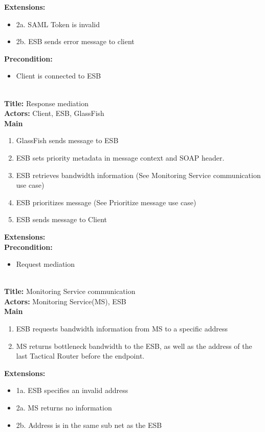     \textbf{Extensions:}
    \begin{itemize}
        \item[] 2a. SAML Token is invalid
        \item[] 2b. ESB sends error message to client
    \end{itemize}
    \textbf{Precondition:}
    \begin{itemize}
        \item Client is connected to ESB
    \end{itemize}
    \\
    \textbf{Title:} Response mediation \\
    \textbf{Actors:} Client, ESB, GlassFish \\
    \textbf{Main}
    \begin{enumerate}
        \item GlassFish sends message to ESB
        \item ESB sets priority metadata in message context and SOAP header.
        \item ESB retrieves bandwidth information (See Monitoring Service communication use case)
        \item ESB prioritizes message (See Prioritize message use case)
        \item ESB sends message to Client
    \end{enumerate}
    \textbf{Extensions:} \\
    \textbf{Precondition:}
    \begin{itemize}
        \item Request mediation
    \end{itemize}
    \\
    \textbf{Title:} Monitoring Service communication\\
    \textbf{Actors:} Monitoring Service(MS), ESB\\
    \textbf{Main}
    \begin{enumerate}
        \item ESB requests bandwidth information from MS to a specific address
        \item MS returns bottleneck bandwidth to the ESB, as well as the address of the last Tactical Router before the endpoint.
    \end{enumerate}
    \textbf{Extensions:}
    \begin{itemize}
        \item[]	1a. ESB specifies an invalid address
        \item[]	2a. MS returns no information
        \item[]	2b. Address is in the same sub net as the ESB
    \end{itemize}

